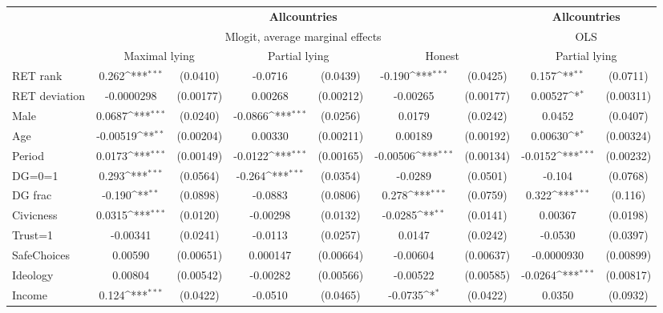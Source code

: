 \def\sym#1{\ifmmode^{#1}\else\(^{#1}\)\fi}
\begin{tabular}{l|cccccc|cc}
\hline\hline
&\multicolumn{6}{c|}{\bf All\space{}countries}&\multicolumn{2}{c}{\bf All\space{}countries}\\ &\multicolumn{6}{c|}{Mlogit, average marginal effects }&\multicolumn{2}{c}{OLS}\\
                &\multicolumn{2}{c}{Maximal lying}&\multicolumn{2}{c}{Partial lying}&\multicolumn{2}{c}{Honest}  &\multicolumn{2}{c}{Partial lying}\\
\hline
RET rank        &    0.262\sym{***}& (0.0410)&  -0.0716         & (0.0439)&   -0.190\sym{***}& (0.0425)&    0.157\sym{**} & (0.0711)\\
RET deviation   &-0.0000298         &(0.00177)&  0.00268         &(0.00212)& -0.00265         &(0.00177)&  0.00527\sym{*}  &(0.00311)\\
Male            &   0.0687\sym{***}& (0.0240)&  -0.0866\sym{***}& (0.0256)&   0.0179         & (0.0242)&   0.0452         & (0.0407)\\
Age             & -0.00519\sym{**} &(0.00204)&  0.00330         &(0.00211)&  0.00189         &(0.00192)&  0.00630\sym{*}  &(0.00324)\\
Period          &   0.0173\sym{***}&(0.00149)&  -0.0122\sym{***}&(0.00165)& -0.00506\sym{***}&(0.00134)&  -0.0152\sym{***}&(0.00232)\\
DG=0=1          &    0.293\sym{***}& (0.0564)&   -0.264\sym{***}& (0.0354)&  -0.0289         & (0.0501)&   -0.104         & (0.0768)\\
DG frac         &   -0.190\sym{**} & (0.0898)&  -0.0883         & (0.0806)&    0.278\sym{***}& (0.0759)&    0.322\sym{***}&  (0.116)\\
Civicness       &   0.0315\sym{***}& (0.0120)& -0.00298         & (0.0132)&  -0.0285\sym{**} & (0.0141)&  0.00367         & (0.0198)\\
Trust=1         & -0.00341         & (0.0241)&  -0.0113         & (0.0257)&   0.0147         & (0.0242)&  -0.0530         & (0.0397)\\
SafeChoices     &  0.00590         &(0.00651)& 0.000147         &(0.00664)& -0.00604         &(0.00637)&-0.0000930         &(0.00899)\\
Ideology        &  0.00804         &(0.00542)& -0.00282         &(0.00566)& -0.00522         &(0.00585)&  -0.0264\sym{***}&(0.00817)\\
Income          &    0.124\sym{***}& (0.0422)&  -0.0510         & (0.0465)&  -0.0735\sym{*}  & (0.0422)&   0.0350         & (0.0932)\\

\end{tabular}
